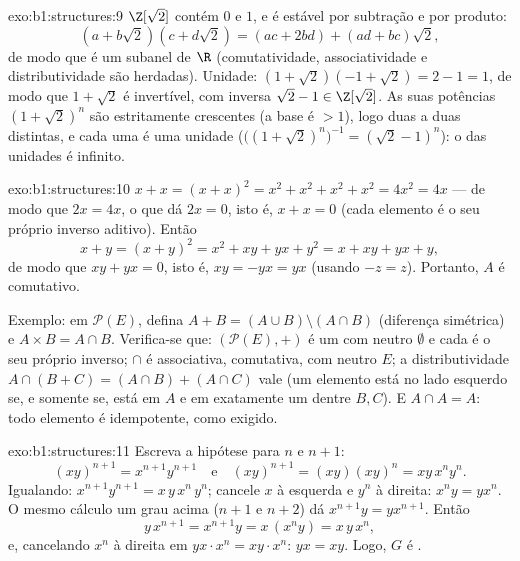 \begin{solution}{exo:b1:structures:9}
$\Z[\sqrt 2]$ contém $0$ e $1$, e é estável por subtração
e por produto:
\[
(a + b\sqrt 2)(c + d\sqrt 2) = (ac + 2bd) + (ad + bc)\sqrt 2 ,
\]
de modo que é um subanel de $\R$ (comutatividade, associatividade e
distributividade são herdadas). Unidade: $(1 + \sqrt 2)(-1 + \sqrt 2) =
2 - 1 = 1$, de modo que $1 + \sqrt 2$ é invertível, com inversa $\sqrt 2 - 1
\in \Z[\sqrt 2]$. As suas potências $(1 + \sqrt 2)^n$ são estritamente
crescentes (a base é $> 1$), logo duas a duas distintas, e cada uma é
uma unidade ($\bigl((1+\sqrt2)^n\bigr)^{-1} = (\sqrt 2 - 1)^n$): o 
das unidades é infinito.
\end{solution}

\begin{solution}{exo:b1:structures:10}
$x + x = (x + x)^2 = x^2 + x^2 + x^2 + x^2 = 4x^2 = 4x$ --- de modo que $2x =
4x$, o que dá $2x = 0$, isto é, $x + x = 0$ (cada elemento é o seu próprio
inverso aditivo). Então
\[
x + y = (x+y)^2 = x^2 + xy + yx + y^2 = x + xy + yx + y ,
\]
de modo que $xy + yx = 0$, isto é, $xy = -yx = yx$ (usando $-z = z$). Portanto, $A$ é
comutativo.

Exemplo: em $\mathcal{P}(E)$, defina $A + B = (A \cup B) \setminus (A
\cap B)$ (diferença simétrica) e $A \times B = A \cap B$. Verifica-se
que: $(\mathcal{P}(E), +)$ é um  com neutro
$\emptyset$ e cada  é o seu próprio inverso; $\cap$ é associativa,
comutativa, com neutro $E$; a distributividade $A \cap (B + C) = (A
\cap B) + (A \cap C)$ vale (um elemento está no lado esquerdo se, e somente se,
está em $A$ e em exatamente um dentre $B, C$). E $A \cap A = A$: todo
elemento é idempotente, como exigido.
\end{solution}

\begin{solution}{exo:b1:structures:11}
Escreva a hipótese para $n$ e $n+1$:
\[
(xy)^{n+1} = x^{n+1} y^{n+1}
\quad\text{e}\quad
(xy)^{n+1} = (xy)(xy)^n = xy\,x^n y^n .
\]
Igualando: $x^{n+1} y^{n+1} = x\,y\,x^n\,y^n$; cancele $x$ à esquerda
e $y^n$ à direita: $x^n y = y x^n$. O mesmo cálculo um
grau acima ($n+1$ e $n+2$) dá $x^{n+1} y = y x^{n+1}$. Então
\[
y\,x^{n+1} = x^{n+1} y = x\,(x^n y) = x\,y\,x^n ,
\]
e, cancelando $x^n$ à direita em $y x \cdot x^n = x y \cdot x^n$:
$yx = xy$. Logo, $G$ é .
\end{solution}

